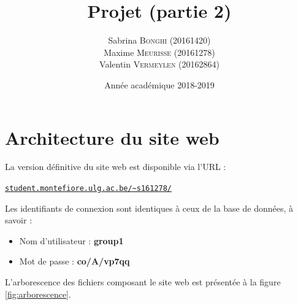 \documentclass[a4paper, 12pt]{article}
\title{Projet (partie 2)}
\author{
    Sabrina \textsc{Bonghi} (20161420)\\
    Maxime \textsc{Meurisse} (20161278)\\
    Valentin \textsc{Vermeylen} (20162864)\\
}
\date{Année académique 2018-2019}
\begin{document}
	
	\section{Architecture du site web}
	\label{sec:architecture}
	La version définitive du site web est disponible via l'URL :
	\begin{center}
	    \href{http://www.student.montefiore.ulg.ac.be/~s161278/}{\texttt{student.montefiore.ulg.ac.be/\textasciitilde s161278/}}
	\end{center}
	Les identifiants de connexion sont identiques à ceux de la base de données, à savoir :
	\begin{itemize}
	    \item Nom d'utilisateur : {\bf group1}
	    \item Mot de passe : {\bf co/A/vp7qq}
	\end{itemize}
	L'arborescence des fichiers composant le site web est présentée à la figure \ref{fig:arborescence}.
\end{document}
